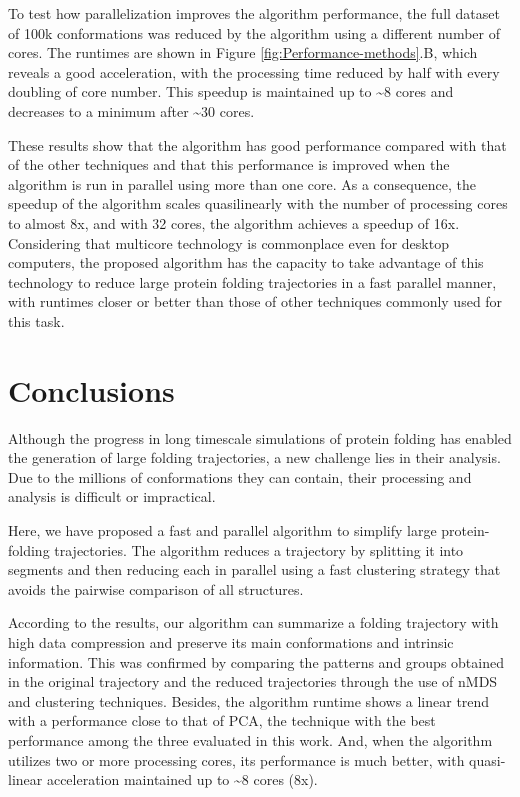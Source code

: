 \documentclass[twocolumn]{bmcart}%
\begin{document}
To test how parallelization improves the algorithm performance, the full dataset of 100k conformations was reduced by the algorithm using a different number of cores. The runtimes are shown in Figure \ref{fig:Performance-methods}.B, which reveals a good acceleration, with the processing time reduced by half with every doubling of core number. This speedup is maintained up to \textasciitilde{}8 cores and decreases to a minimum after \textasciitilde{}30 cores.

These results show that the algorithm has good performance compared with that of the other techniques and that this performance is improved when the algorithm is run in parallel using more than one core. As a consequence, the speedup of the algorithm scales quasilinearly with the number of processing cores to almost 8x, and with 32 cores, the algorithm achieves a speedup of 16x. Considering that multicore technology is commonplace even for desktop computers, the proposed algorithm has the capacity to take advantage of this technology to reduce large protein folding trajectories in a fast parallel manner, with runtimes closer or better than those of other techniques commonly used for this task.


\section*{Conclusions}

Although the progress in long timescale simulations of protein folding has enabled the generation of large folding trajectories, a new challenge lies in their analysis. Due to the millions of conformations they can contain, their processing and analysis is difficult or impractical.

Here, we have proposed a fast and parallel algorithm to simplify large protein-folding trajectories. The algorithm reduces a trajectory by splitting it into segments and then reducing each in parallel using a fast clustering strategy that avoids the pairwise comparison of all structures.

According to the results, our algorithm can summarize a folding trajectory with high data compression and preserve its main conformations and intrinsic information. This was confirmed by comparing the patterns and groups obtained in the original trajectory and the reduced trajectories through the use of nMDS and clustering techniques. Besides, the algorithm runtime shows a linear trend with a performance close to that of PCA, the technique with the best performance among the three evaluated in this work. And, when the algorithm utilizes two or more processing cores, its performance is much better, with quasi-linear acceleration maintained up to \textasciitilde{}8 cores (8x).
\end{document}
